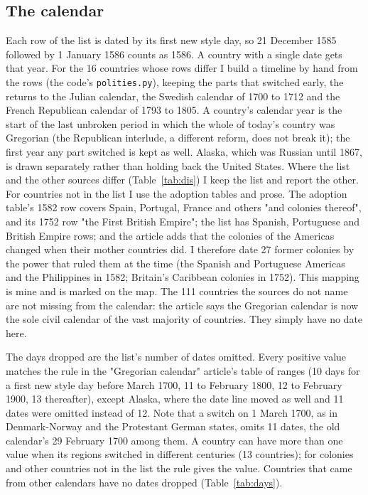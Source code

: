 \documentclass[11pt,a4paper]{article}
\begin{document}
\subsection{The calendar}
Each row of the list is dated by its first new style day, so 21 December 1585 followed by 1 January 1586 counts as 1586. A country with a single date gets that year. For the 16 countries whose rows differ I build a timeline by hand from the rows (the code's \texttt{polities.py}), keeping the parts that switched early, the returns to the Julian calendar, the Swedish calendar of 1700 to 1712 and the French Republican calendar of 1793 to 1805. A country's calendar year is the start of the last unbroken period in which the whole of today's country was Gregorian (the Republican interlude, a different reform, does not break it); the first year any part switched is kept as well. Alaska, which was Russian until 1867, is drawn separately rather than holding back the United States. Where the list and the other sources differ (Table~\ref{tab:dis}) I keep the list and report the other. For countries not in the list I use the adoption tables and prose. The adoption table's 1582 row covers Spain, Portugal, France and others "and colonies thereof", and its 1752 row "the First British Empire"; the list has Spanish, Portuguese and British Empire rows; and the article adds that the colonies of the Americas changed when their mother countries did. I therefore date 27 former colonies by the power that ruled them at the time (the Spanish and Portuguese Americas and the Philippines in 1582; Britain's Caribbean colonies in 1752). This mapping is mine and is marked on the map. The 111 countries the sources do not name are not missing from the calendar: the article says the Gregorian calendar is now the sole civil calendar of the vast majority of countries. They simply have no date here.

The days dropped are the list's number of dates omitted. Every positive value matches the rule in the "Gregorian calendar" article's table of ranges (10 days for a first new style day before March 1700, 11 to February 1800, 12 to February 1900, 13 thereafter), except Alaska, where the date line moved as well and 11 dates were omitted instead of 12. Note that a switch on 1 March 1700, as in Denmark-Norway and the Protestant German states, omits 11 dates, the old calendar's 29 February 1700 among them. A country can have more than one value when its regions switched in different centuries (13 countries); for colonies and other countries not in the list the rule gives the value. Countries that came from other calendars have no dates dropped (Table~\ref{tab:days}).
\end{document}
